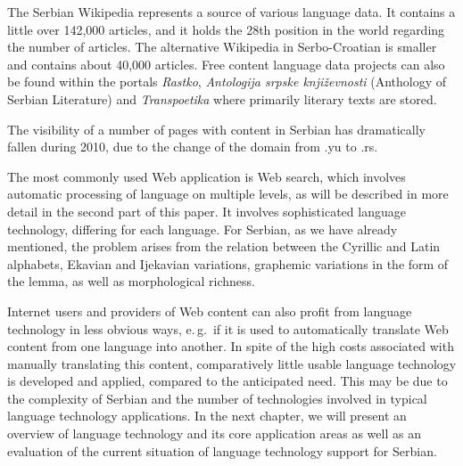 \begin{multicols}{2}
The Serbian Wikipedia represents a source of various language data. It contains a little over 142,000 articles, and it holds the 28th position \cite{WIKI} in the world regarding the number of articles. The alternative Wikipedia in Serbo-Croatian \cite{SHWIKI} is smaller and contains about 40,000 articles. Free content language data projects can also be found within the portals \textit{Rastko}, \cite{RASTKO} \textit{Antologija srpske književnosti} \cite{ASK} (Anthology of Serbian Literature) and \textit{Transpoetika} \cite{TRPOET} where primarily literary texts are stored. 

The visibility of a number of pages with content in Serbian has dramatically fallen during 2010, due to the change of the domain from .yu to .rs. 

The most commonly used Web application is Web search, which involves automatic processing of language on multiple levels, as will be described in more detail in the second part of this paper. It involves sophisticated language technology, differing for each language. For Serbian, as we have already mentioned, the problem arises from the relation between the Cyrillic and Latin alphabets, Ekavian and Ijekavian variations, graphemic variations in the form of the lemma, as well as morphological richness. 

Internet users and providers of Web content can also profit from language technology in less obvious ways, e.\,g.~if it is used to automatically translate Web content from one language into another. In spite of the high costs associated with manually translating this content, comparatively little usable language technology is developed and applied, compared to the anticipated need. This may be due to the complexity of Serbian and the number of technologies involved in typical language technology applications. In the next chapter, we will present an overview of language technology and its core application areas as well as an evaluation of the current situation of language technology support for Serbian.  
\end{multicols}

\clearpage



